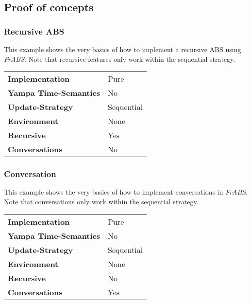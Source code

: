 \subsection{Proof of concepts}
\subsubsection{Recursive ABS} This example shows the very basics of how to implement a recursive ABS using \textit{FrABS}. Note that recursive features only work within the sequential strategy.

\begin{center}
\begin{tabular}{l || l }
\textbf{Implementation}			& Pure \\
\textbf{Yampa Time-Semantics}	& No \\
\textbf{Update-Strategy}		& Sequential \\
\textbf{Environment}			& None \\
\textbf{Recursive}				& Yes \\
\textbf{Conversations}			& No \\
\end{tabular}
\end{center}

\subsubsection{Conversation} This example shows the very basics of how to implement conversations in \textit{FrABS}. Note that conversations only work within the sequential strategy.

\begin{center}
\begin{tabular}{l || l }
\textbf{Implementation}			& Pure \\
\textbf{Yampa Time-Semantics}	& No \\
\textbf{Update-Strategy}		& Sequential \\
\textbf{Environment}			& None \\
\textbf{Recursive}				& No \\
\textbf{Conversations}			& Yes \\
\end{tabular}
\end{center}